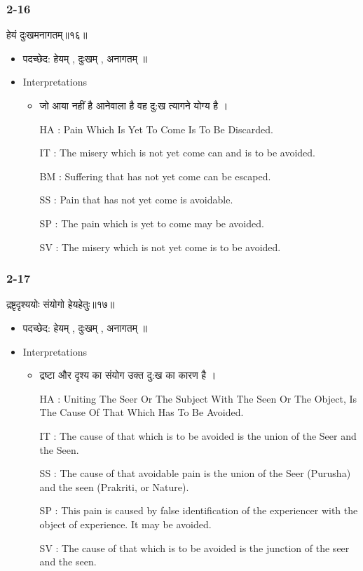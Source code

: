 \begin{frame}[fragile]\frametitle{2-16}
\begin{sanskrit}
हेयं दुःखमनागतम्॥१६॥
\end{sanskrit}

	\begin{itemize}
	\item पदच्छेद: हेयम् , दुःखम् , अनागतम् ॥
	\item Interpretations
		\begin{itemize}
		\item जो आया नहीं है आनेवाला है वह दु:ख त्यागने योग्य है ।
		\item [HA]: Pain Which Is Yet To Come Is To Be Discarded.
		\item [IT]: The misery which is not yet come can and is to be avoided.
		\item [BM]: Suffering that has not yet come can be escaped.
		\item [SS]: Pain that has not yet come is avoidable.
		\item [SP]: The pain which is yet to come may be avoided.
		\item [SV]: The misery which is not yet come is to be avoided. 
		\end{itemize}
	\end{itemize}
	
\end{frame}


\begin{frame}[fragile]\frametitle{2-17}
\begin{sanskrit}
द्रष्टृदृश्ययोः संयोगो हेयहेतुः॥१७॥
\end{sanskrit}

	\begin{itemize}
	\item पदच्छेद: हेयम् , दुःखम् , अनागतम् ॥
	\item Interpretations
		\begin{itemize}
		\item द्रष्टा और दृश्य का संयोग उक्त दु:ख का कारण है ।
		\item [HA]: Uniting The Seer Or The Subject With The Seen Or The Object, Is The Cause Of That Which Has To Be Avoided.
		\item [IT]: The cause of that which is to be avoided is the union of the Seer and the Seen.
		\item [SS]: The cause of that avoidable pain is the union of the Seer (Purusha) and the seen (Prakriti, or Nature).
		\item [SP]: This pain is caused by false identification of the experiencer with the object of experience. It may be avoided.
		\item [SV]: The cause of that which is to be avoided is the junction of the seer and the seen. 
		\end{itemize}
	\end{itemize}
	
\end{frame}

